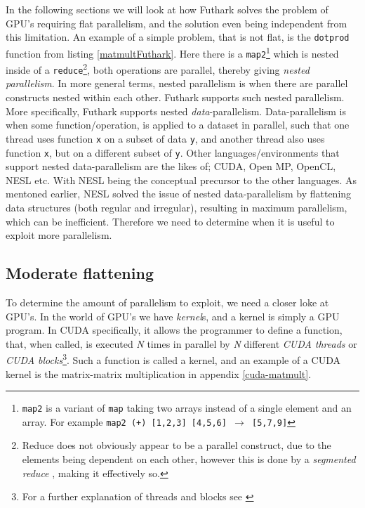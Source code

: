 In the following sections we will look at how Futhark solves the problem of GPU's requiring flat parallelism, and the solution even being independent from this limitation. An example of a simple problem, that is not flat, is the \texttt{dotprod} function from listing \ref{matmultFuthark}. Here there is a \texttt{map2}\footnote{\texttt{map2} is a variant of \texttt{map} taking two arrays instead of a single element and an array. For example \texttt{map2 (+) [1,2,3] [4,5,6] $\to$ [5,7,9]}} which is nested inside of a \texttt{reduce}\footnote{Reduce does not obviously appear to be a parallel construct, due to the elements being dependent on each other, however this is done by a \textit{segmented reduce} \cite{segred}, making it effectively so.}, both operations are parallel, thereby giving \textit{nested parallelism}. In more general terms, nested parallelism is when there are parallel constructs nested within each other. Futhark supports such nested parallelism. More specifically, Futhark supports nested \textit{data}-parallelism. Data-parallelism is when some function/operation, is applied to a dataset in parallel, such that one thread uses function \texttt{x} on a subset of data \texttt{y}, and another thread also uses function \texttt{x}, but on a different subset of \texttt{y}. Other languages/environments that support nested data-parallelism are the likes of; CUDA, Open MP, OpenCL, NESL etc. With NESL being the conceptual precursor to the other languages. As mentoned earlier, NESL solved the issue of nested data-parallelism by flattening data structures (both regular and irregular), resulting in maximum parallelism, which can be inefficient. Therefore we need to determine when it is useful to exploit more parallelism. 

\subsection{Moderate flattening}
To determine the amount of parallelism to exploit, we need a closer loke at GPU's. In the world of GPU's we have \textit{kernel}s, and a kernel is simply a GPU program. In CUDA specifically, it allows the programmer to define a function, that, when called, is executed \textit{N} times in parallel by \textit{N} different \textit{CUDA threads} or \textit{CUDA blocks}\footnote{For a further explanation of threads and blocks see \cite[p. 5-9]{prog-guide-cuda}}. Such a function is called a kernel, and an example of a CUDA kernel is the matrix-matrix multiplication in appendix \ref{cuda-matmult}. 

